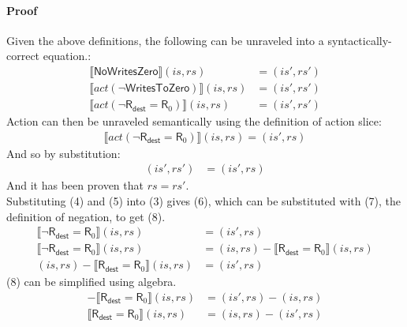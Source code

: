 \documentclass[12pt, letterpaper]{article}
\begin{document}
\paragraph{Proof}
    Given the above definitions, the following can be unraveled into a syntactically-correct equation.:
\begin{align}
    \llbracket \mathsf{NoWritesZero} \rrbracket (\mathit{is}, \mathit{rs}) 
    &=
    (\mathit{is}', \mathit{rs}')
    \\
    \llbracket act(\neg \mathsf{WritesToZero}) \rrbracket (\mathit{is}, \mathit{rs}) 
    &=
    (\mathit{is}', \mathit{rs}')
    \\
    \llbracket act(\neg \mathsf{R}_{\mathsf{dest}} = \mathsf{R}_0) \rrbracket (\mathit{is}, \mathit{rs}) 
    &=
    (\mathit{is}', \mathit{rs}')
\end{align}
    Action can then be unraveled semantically using the definition of action slice:
\begin{align}
    \llbracket act(\neg \mathsf{R}_{\mathsf{dest}} = \mathsf{R}_0) \rrbracket (\mathit{is}, \mathit{rs}) 
    =
    (\mathit{is}', \mathit{rs})
\end{align}
    And so by substitution:
\begin{align}
    (\mathit{is}', \mathit{rs}')
    &=
    (\mathit{is}', \mathit{rs})
\end{align}
    And it has been proven that $\mathit{rs} = \mathit{rs'}$.\\
    Substituting (4) and (5) into (3) gives (6), which can be substituted with (7), the definition of negation, to get (8). 
\begin{align}
    \llbracket \neg \mathsf{R}_{\mathsf{dest}} = \mathsf{R}_0 \rrbracket (\mathit{is}, \mathit{rs}) 
    &=
    (\mathit{is}', \mathit{rs})\\
    \llbracket \neg \mathsf{R}_{\mathsf{dest}} = \mathsf{R}_0 \rrbracket (\mathit{is}, \mathit{rs}) 
    &=
    (\mathit{is}, \mathit{rs}) - \llbracket \mathsf{R}_{\mathsf{dest}} = \mathsf{R}_0 \rrbracket (\mathit{is}, \mathit{rs})\\ %
    (\mathit{is}, \mathit{rs}) - \llbracket \mathsf{R}_{\mathsf{dest}} = \mathsf{R}_0 \rrbracket (\mathit{is}, \mathit{rs}) 
    &=
    (\mathit{is}', \mathit{rs})
\end{align}
    (8) can be simplified using algebra.
\begin{align}    
    - \llbracket \mathsf{R}_{\mathsf{dest}} = \mathsf{R}_0 \rrbracket (\mathit{is}, \mathit{rs}) 
    &=
    (\mathit{is}', \mathit{rs}) - (\mathit{is}, \mathit{rs})
    \\
    \llbracket \mathsf{R}_{\mathsf{dest}} = \mathsf{R}_0 \rrbracket (\mathit{is}, \mathit{rs}) 
    &=
    (\mathit{is}, \mathit{rs}) - (\mathit{is}', \mathit{rs})
\end{align}
\end{document}
